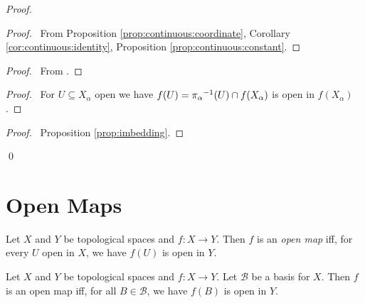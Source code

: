 \begin{proof}
  \pf
  \begin{proof}
    \pf\ From Proposition \ref{prop:continuous:coordinate}, Corollary \ref{cor:continuous:identity}, Proposition \ref{prop:continuous:constant}.
  \end{proof}
  \begin{proof}
    \pf\ From .
  \end{proof}
  \begin{proof}
    \pf\ For $U \subseteq X_\alpha$ open we have $f(U) = {\pi_\alpha}^{-1}(U) \cap f(X_\alpha)$ is open in $f(X_\alpha)$.
  \end{proof}
  \qedstep
  \begin{proof}
    \pf\ Proposition \ref{prop:imbedding}.
  \end{proof}
  \qed
\end{proof}

\section{Open Maps}

\begin{df}
  Let $X$ and $Y$ be topological spaces and $f : X \rightarrow Y$. Then $f$ is an \emph{open map} iff, for every $U$ open in $X$, we have $f(U)$ is open in $Y$.
\end{df}

\begin{prop}
  \label{prop:open_map:basis}
  Let $X$ and $Y$ be topological spaces and $f : X \rightarrow Y$. Let $\mathcal{B}$ be a basis for $X$. Then $f$ is an open map iff, for all $B \in \mathcal{B}$, we have $f(B)$ is open in $Y$.
\end{prop}

